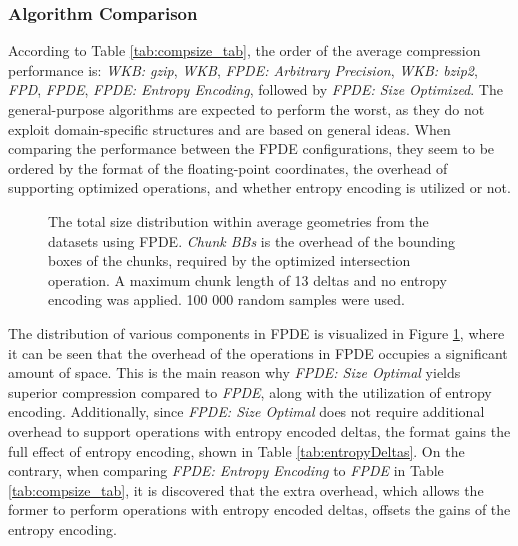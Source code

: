 \subsubsection{Algorithm Comparison}
According to Table \ref{tab:compsize_tab}, the order of the average compression performance is: \textit{WKB: gzip}, \textit{WKB}, \textit{FPDE: Arbitrary Precision}, \textit{WKB: bzip2}, \textit{FPD}, \textit{FPDE}, \textit{FPDE: Entropy Encoding}, followed by \textit{FPDE: Size Optimized}. The general-purpose algorithms are expected to perform the worst, as they do not exploit domain-specific structures and are based on general ideas. When comparing the performance between the FPDE configurations, they seem to be ordered by the format of the floating-point coordinates, the overhead of supporting optimized operations, and whether entropy encoding is utilized or not. 

\begin{figure}[htbp]
    \centering
    
    \caption{The total size distribution within average geometries from the datasets using FPDE. \textit{Chunk BBs} is the overhead of the bounding boxes of the chunks, required by the optimized intersection operation. A maximum chunk length of 13 deltas and no entropy encoding was applied. 100 000 random samples were used.}
    \label{fig:overheaddistrb}
\end{figure}

The distribution of various components in FPDE is visualized in Figure \ref{fig:overheaddistrb}, where it can be seen that the overhead of the operations in FPDE occupies a significant amount of space. This is the main reason why \textit{FPDE: Size Optimal} yields superior compression compared to \textit{FPDE}, along with the utilization of entropy encoding. Additionally, since \textit{FPDE: Size Optimal} does not require additional overhead to support operations with entropy encoded deltas, the format gains the full effect of entropy encoding, shown in Table \ref{tab:entropyDeltas}. On the contrary, when comparing \textit{FPDE: Entropy Encoding} to \textit{FPDE} in Table \ref{tab:compsize_tab}, it is discovered that the extra overhead, which allows the former to perform operations with entropy encoded deltas, offsets the gains of the entropy encoding.

